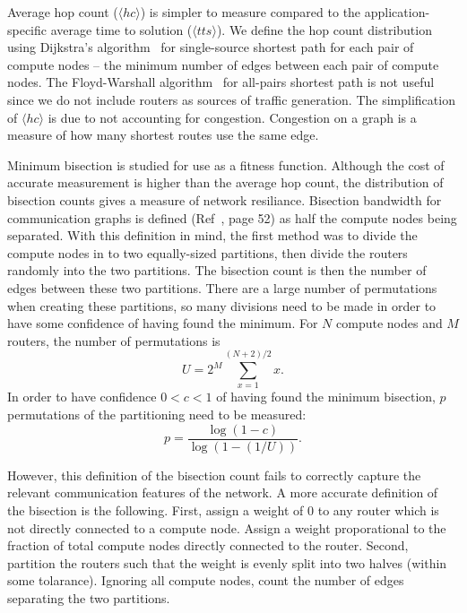 \documentclass[pdftex]{article}
\begin{document}
Average hop count ($\langle hc \rangle$) is simpler to measure compared to the application-specific average time to solution ($\langle tts \rangle$). We define the hop count distribution using Dijkstra's algorithm~\cite{1959_Dijkstra} for single-source shortest path for each pair of compute nodes -- the minimum number of edges between each pair of compute nodes.  The Floyd-Warshall algorithm~\cite{1962_Floyd} for all-pairs shortest path is not useful since we do not include routers as sources of traffic generation. The simplification of $\langle hc \rangle$ is due to not accounting for congestion. Congestion on a graph is a measure of how many shortest routes use the same edge.

Minimum bisection is studied for use as a fitness function. Although the cost of accurate measurement is higher than the average hop count, the distribution of bisection counts gives a measure of network resiliance. Bisection bandwidth for communication graphs is defined (Ref~\cite{1980_Thompson}, page 52) as half the compute nodes being separated. With this definition in mind, the first method was to divide the compute nodes in to two equally-sized partitions, then divide the routers randomly into the two partitions. The bisection count is then the number of edges between these two partitions. There are a large number of permutations when creating these partitions, so many divisions need to be made in order to have some confidence of having found the minimum. For $N$ compute nodes and $M$ routers, the number of permutations is
\begin{equation}
 U = 2^M \sum_{x=1}^{(N+2)/2}x.
\end{equation}
In order to have confidence $0<c<1$ of having found the minimum bisection, $p$ permutations of the partitioning need to be measured:
\begin{equation}
 p = \frac{\log(1-c)}{\log(1-(1/U))}.
\end{equation}

However, this definition of the bisection count fails to correctly capture the relevant communication features of the network. A more accurate definition of the bisection is the following. First, assign a weight of 0 to any router which is not directly connected to a compute node. Assign a weight proporational to the fraction of total compute nodes directly connected to the router. Second, partition the routers such that the weight is evenly split into two halves (within some tolarance). Ignoring all compute nodes, count the number of edges separating the two partitions.
\end{document}
